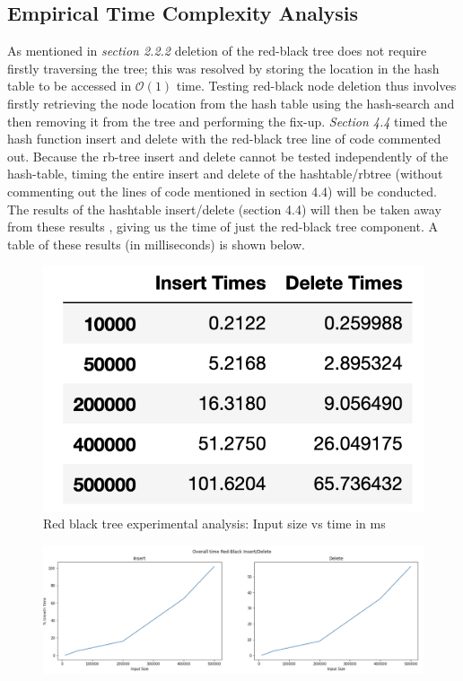 \documentclass[11p]{article}
\begin{document}
\subsection{Empirical Time Complexity Analysis}
As mentioned in \textit{section 2.2.2} deletion of the red-black tree does not require firstly traversing the tree; this was resolved by storing the location in the hash table to be accessed in $\mathcal{O}(1)$ time. Testing red-black node deletion thus involves firstly retrieving the node location from the hash table using the hash-search and then removing it from the tree and performing the fix-up. \textit{Section 4.4} timed the hash function insert and delete with the red-black tree line of code commented out. Because the rb-tree insert and delete cannot be tested independently of the hash-table, timing the entire insert and delete of the hashtable/rbtree (without commenting out the lines of code mentioned in section 4.4) will be conducted. The results of the hashtable insert/delete (section 4.4) will then be taken away from these results , giving us the time of just the red-black tree component. A table of these results (in milliseconds) is shown below.


\begin{figure}[hbt!]
	\centering
	\includegraphics[width=0.3\linewidth]{experimental_results/rbtreetable.png}
	\caption{Red black tree experimental analysis: Input size vs time in ms}
\end{figure}
\begin{figure}[hbt!]
	\centering
	\includegraphics[width=0.6\linewidth]{experimental_results/rbgraph.png}
\end{figure}
\end{document}
